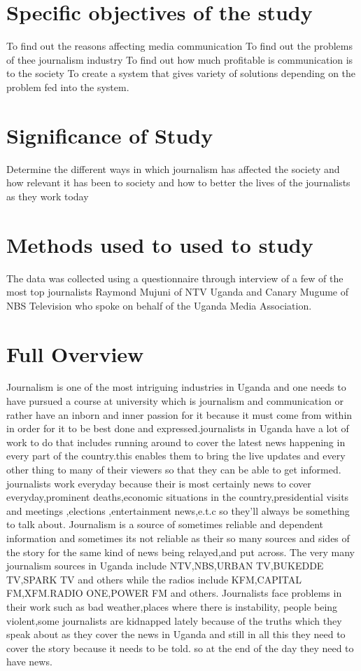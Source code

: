 \documentclass[12pt,]{article}
\begin{document}
\section{Specific objectives of the study}
To find out the reasons affecting media communication
To find out the problems of thee journalism industry
To find out how much profitable is communication is to the society
To create a system that gives variety of solutions depending on the problem fed into the system.

\section{Significance of Study}
Determine the different ways in which journalism has affected the society and how relevant it has been to society and how to better the lives of the journalists as they work today

\section{Methods used to used to study}
The data was collected using a questionnaire through interview of a few of the most top journalists  Raymond Mujuni of NTV Uganda and Canary Mugume of NBS Television who spoke on behalf of the Uganda Media Association.


\section{Full Overview}
Journalism is one of the most intriguing industries in Uganda and one needs to have pursued a course at university which is journalism and communication or rather have an inborn and inner  passion for it because it must come from within in order for it to be best done and expressed.journalists in Uganda have a lot of work to do that includes running around to cover the latest news happening in every part of the country.this enables them to bring the live updates and every other thing to many of their viewers so that they can be able to get informed.
journalists work everyday because their is most certainly news to cover everyday,prominent deaths,economic situations in the country,presidential visits and meetings ,elections ,entertainment news,e.t.c so they'll always be something to talk about.
Journalism is a source of sometimes reliable and dependent information and sometimes its not reliable as their so many sources and sides of the story for the same kind of news being relayed,and put across.
  The very many journalism sources in Uganda include NTV,NBS,URBAN TV,BUKEDDE TV,SPARK TV and others while the radios include KFM,CAPITAL FM,XFM.RADIO ONE,POWER FM and others.
 Journalists face problems in their work such as bad weather,places where there is instability, people being violent,some journalists are kidnapped lately because of the truths which they speak about as they cover the news in Uganda and still in all this they need to cover the story because it needs to be told. so at the end of the day they need to have news.  
 
\end{document}
